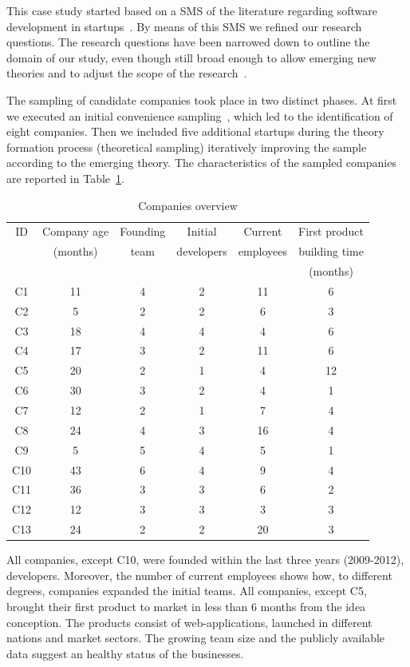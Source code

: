 \documentclass[10pt,journal,letterpaper,compsoc]{IEEEtran}
\begin{document}
This case study started based on a SMS of the literature regarding software
development in startups~\cite{SMS}. By means of this SMS we refined our research
questions. The research questions have been narrowed down to outline the domain
of our study, even though still broad enough to allow emerging new theories and
to adjust the scope of the research~\cite{Corbin1990}.

The sampling of candidate companies took place in two distinct phases. At first
we executed an initial convenience sampling~\cite{Dawson2009}, which led to the
identification of eight companies. Then we included five additional startups
during the theory formation process (theoretical sampling) iteratively improving
the sample according to the emerging theory. The characteristics of the sampled
companies are reported in Table~\ref{t_interviews-stats}.


\begin{table}[!t]
\renewcommand{\arraystretch}{1.3}
\caption{Companies overview}
\label{t_interviews-stats}
\centering
\begin{tabular}{|c||c||c||c||c||c|}

\hline
    ID & Company age & Founding & Initial & Current & First product \\
    & (months) & team & developers & employees & building time \\
                    & & & & & (months) \\
   \hline
C1 & 11 & 4 & 2 & 11 & 6 \\
C2 & 5 & 2 & 2 & 6 & 3 \\
C3 & 18 & 4 & 4 & 4 & 6 \\
C4 & 17 & 3 & 2 & 11 & 6 \\
C5 & 20 & 2 & 1 & 4 & 12 \\
C6 & 30 & 3 & 2 & 4 & 1 \\
C7 & 12 & 2 & 1 & 7 & 4 \\
C8 & 24 & 4 & 3 & 16 & 4 \\
C9 & 5 & 5 & 4 & 5 & 1 \\
C10 & 43 & 6 & 4 & 9 & 4 \\
C11 & 36 & 3 & 3 & 6 & 2 \\
C12 & 12 & 3 & 3 & 3 & 3 \\
C13 & 24 & 2 & 2 & 20 & 3 \\
 
\hline
\end{tabular}
\end{table}

All companies, except C10, were founded within the last three years (2009-2012),
developers. Moreover, the number of current employees shows how, to different
degrees, companies expanded the initial teams. All companies, except C5,
brought their first product to market in less than 6 months from the idea
conception. The products consist of web-applications, launched in different
nations and market sectors. The growing team size and the publicly available
data suggest an healthy status of the businesses.
\end{document}
